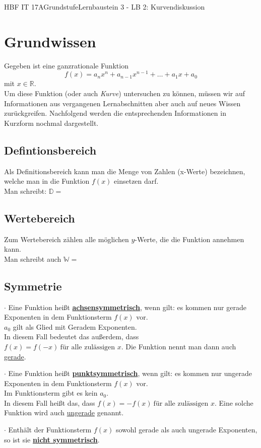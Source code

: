 \documentclass[11pt,twocolumn,oneside,openany,headings=optiontotoc,11pt,numbers=noenddot]{article}
\begin{document}
	\begin{worksheet}{HBF IT 17A}{Grundstufe}{Lernbaustein 3 - LB 2: Kurvendiskussion}
		\section{Grundwissen}
		Gegeben ist eine ganzrationale Funktion \[f(x) = a_nx^n + a_{n-1}x^{n-1} + \ldots + a_1x + a_0 \] mit \(x\in\mathbb{R}\).\\
		Um diese Funktion (oder auch \textit{Kurve}) untersuchen zu können, müssen wir auf Informationen aus vergangenen Lernabschnitten aber auch auf neues Wissen zurückgreifen. Nachfolgend werden die entsprechenden Informationen in Kurzform nochmal dargestellt.
		\subsection{Defintionsbereich} Als Definitionsbereich kann man die Menge von Zahlen (x-Werte) bezeichnen, welche man in die Funktion \(f(x)\) einsetzen darf.\\
		Man schreibt: \(\mathbb{D} = \)\\
		\subsection{Wertebereich} Zum Wertebereich zählen alle möglichen \(y\)-Werte, die die Funktion annehmen kann.\\
		Man schreibt auch \(\mathbb{W} = \)\\
		\subsection{Symmetrie} \(\cdot\) Eine Funktion heißt \underline{\textbf{achsensymmetrisch}}, wenn gilt: es kommen nur gerade Exponenten in dem Funktionsterm \(f(x)\) vor.\\
		\tiny{\(a_0\) gilt als Glied mit Geradem Exponenten.}\normalsize\\
		In diesem Fall bedeutet das außerdem, dass \(f(x) = f(-x)\ \text{für alle zulässigen } x\). Die Funktion nennt man dann auch \underline{gerade}.\\
		\par\noindent
		\(\cdot\) Eine Funktion heißt \underline{\textbf{punktsymmetrisch}}, wenn gilt: es kommen nur ungerade Exponenten in dem Funktionsterm \(f(x)\) vor.\\
		\tiny{Im Funktionsterm gibt es kein \(a_0\).}\normalsize\\
		In diesem Fall heißt das, dass \(f(x) = -f(x)\ \text{für alle zulässigen } x\). Eine solche Funktion wird auch \underline{ungerade} genannt.\\
		\par\noindent
		\(\cdot\) Enthält der Funktionsterm \(f(x)\) sowohl gerade als auch ungerade Exponenten, so ist sie \underline{\textbf{nicht symmetrisch}}.

\end{worksheet}
\end{document}
